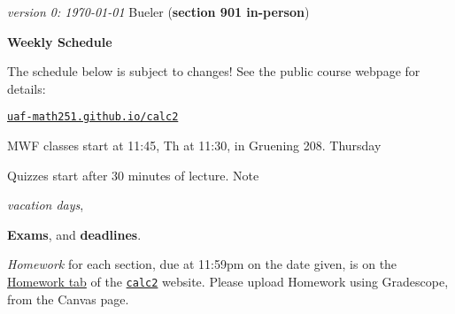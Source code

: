\documentclass[12pt]{article}
\newcommand{\vacinline}[1]{{\color{OliveGreen} \textsl{#1}}}
\newcommand{\vac}[1]{\strut {\small {\vacinline{#1}}}}
\newcommand{\due}[1]{\strut {\color{BrickRed} \textsl{#1}}}
\newcommand{\dl}[1]{{\small \color{Purple} \textbf{#1}}}
\newcommand{\ee}[1]{\strut {\color{Blue} \textbf{#1}}}
\newcommand{\qq}[1]{\strut {\color{RedOrange} #1}}
\begin{document}
\noindent\footnotesize \emph{version 0: \today} \normalsize \hfill Bueler (\textbf{section 901 in-person})

\bigskip
\centerline{\Large \textbf{Weekly Schedule}}

\bigskip
The schedule below is subject to changes!  See the public course webpage for details:

\medskip

\centerline{\href{https://uaf-math251.github.io/calc2/}{\texttt{uaf-math251.github.io/calc2}}}

\noindent MWF classes start at 11:45, Th at 11:30, in Gruening 208.  Thursday \qq{Quizzes} start after 30 minutes of lecture.  Note \vac{vacation days}, \ee{Exams}, and \dl{deadlines}.  \due{Homework} for each section, due at 11:59pm on the date given, is on the \href{https://uaf-math251.github.io/calc2/}{Homework tab} of the \href{https://uaf-math251.github.io/calc2/}{\texttt{calc2}} website.  Please upload Homework using Gradescope, from the Canvas page.

\bigskip
\end{document}
